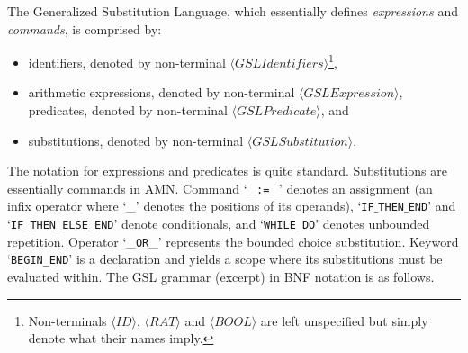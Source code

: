 \documentclass[a4paper,openany]{book}
\begin{document}
The Generalized Substitution Language, which essentially defines \emph{expressions} and \emph{commands}, is comprised by:
\begin{itemize}
\item identifiers, denoted by non-terminal $\langle\mathit{GSLIdentifiers}\rangle$\footnote{Non-terminals $\langle\mathit{ID}\rangle$, $\langle\mathit{RAT}\rangle$ and $\langle\mathit{BOOL}\rangle$ are left unspecified but simply denote what their names imply.}, 
\item arithmetic expressions, denoted by non-terminal $\langle\mathit{GSLExpression}\rangle$, predicates, denoted by non-terminal $\langle\mathit{GSLPredicate}\rangle$, and 
\item substitutions, denoted by non-terminal $\langle\mathit{GSLSubstitution}\rangle$. 
\end{itemize}
The notation for expressions and predicates is quite standard. Substitutions are essentially commands in AMN. Command `\_\texttt{:=}\_' denotes an assignment (an infix operator where `\_' denotes the positions of its operands),  `\texttt{IF$\_$THEN$\_$END}' and `\texttt{IF\_THEN\_ELSE\_END}' denote conditionals, and `\texttt{WHILE\_DO}' denotes unbounded repetition. 
Operator `\_\texttt{OR}\_' represents the bounded choice substitution. Keyword `\texttt{BEGIN\_END}' is a declaration and yields a scope where its substitutions must be evaluated within. The GSL grammar (excerpt) in BNF notation is as follows.
\end{document}
